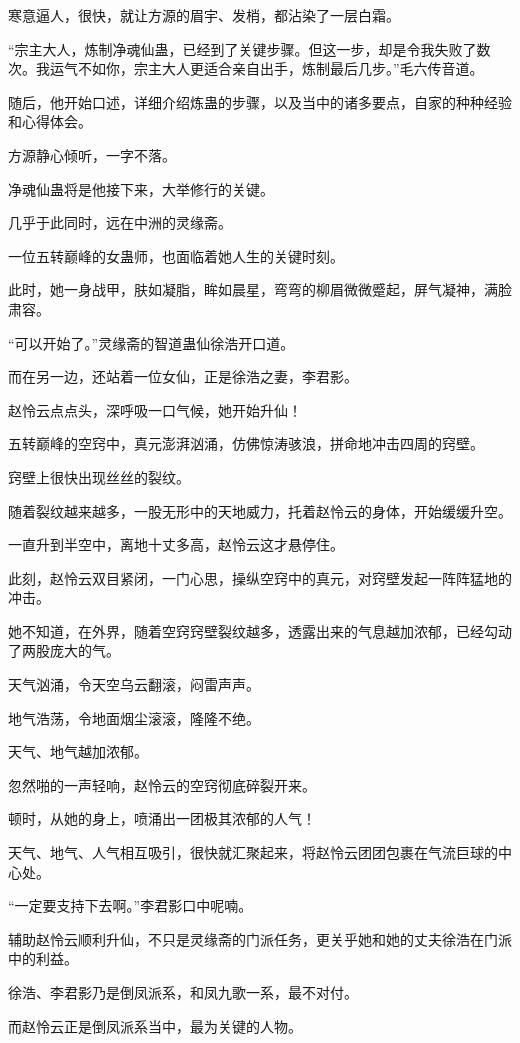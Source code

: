 \begin{this_body}
寒意逼人，很快，就让方源的眉宇、发梢，都沾染了一层白霜。

“宗主大人，炼制净魂仙蛊，已经到了关键步骤。但这一步，却是令我失败了数次。我运气不如你，宗主大人更适合亲自出手，炼制最后几步。”毛六传音道。

随后，他开始口述，详细介绍炼蛊的步骤，以及当中的诸多要点，自家的种种经验和心得体会。

方源静心倾听，一字不落。

净魂仙蛊将是他接下来，大举修行的关键。

几乎于此同时，远在中洲的灵缘斋。

一位五转巅峰的女蛊师，也面临着她人生的关键时刻。

此时，她一身战甲，肤如凝脂，眸如晨星，弯弯的柳眉微微蹙起，屏气凝神，满脸肃容。

“可以开始了。”灵缘斋的智道蛊仙徐浩开口道。

而在另一边，还站着一位女仙，正是徐浩之妻，李君影。

赵怜云点点头，深呼吸一口气候，她开始升仙！

五转巅峰的空窍中，真元澎湃汹涌，仿佛惊涛骇浪，拼命地冲击四周的窍壁。

窍壁上很快出现丝丝的裂纹。

随着裂纹越来越多，一股无形中的天地威力，托着赵怜云的身体，开始缓缓升空。

一直升到半空中，离地十丈多高，赵怜云这才悬停住。

此刻，赵怜云双目紧闭，一门心思，操纵空窍中的真元，对窍壁发起一阵阵猛地的冲击。

她不知道，在外界，随着空窍窍壁裂纹越多，透露出来的气息越加浓郁，已经勾动了两股庞大的气。

天气汹涌，令天空乌云翻滚，闷雷声声。

地气浩荡，令地面烟尘滚滚，隆隆不绝。

天气、地气越加浓郁。

忽然啪的一声轻响，赵怜云的空窍彻底碎裂开来。

顿时，从她的身上，喷涌出一团极其浓郁的人气！

天气、地气、人气相互吸引，很快就汇聚起来，将赵怜云团团包裹在气流巨球的中心处。

“一定要支持下去啊。”李君影口中呢喃。

辅助赵怜云顺利升仙，不只是灵缘斋的门派任务，更关乎她和她的丈夫徐浩在门派中的利益。

徐浩、李君影乃是倒凤派系，和凤九歌一系，最不对付。

而赵怜云正是倒凤派系当中，最为关键的人物。


\end{this_body}
